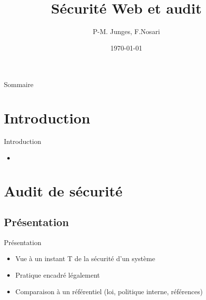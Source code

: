 \documentclass{beamer}
\title{Sécurité Web et audit}
\author{P-M. Junges, F.Nosari}
\institute{Faculté des Sciences et Technologies}
\date{\today}
\begin{document}
\begin{frame}
	\titlepage
\end{frame}

\begin{frame}{Sommaire}
	\tableofcontents
\end{frame}

\section{Introduction}
	\begin{frame}{Introduction}
		\begin{itemize}
			\item %
		\end{itemize}
	\end{frame}

\begin{comment}
	Ca me semble "complet" mais si on doit faire 15 mins de pres
	on risque de prendre pas mal de temps sur cette partie

	I Audit de sécurité
		Definition
			donner def + norme ISO
		Pré requis pour l'audit
			6 principes à respecter
		Preparer l’audit
			expliquer graphique de la page 5 de la norme ISO
		Execution de l’audit
			tests d'intrusion
				def boite blanche, noire, grise
				outils d'intrusion
			test de vulnerabilites
				Outils de tests de vulnerabilites
		Conclure audit
			donner recommendations sur ce qu'il faut changer etc

	En y réfléchissant on aurait moyen de faire notre presentation sur une seule partie
	qui serait donc la partie Audit de sécurité (pour un site web) et ensuite toute la partie
	faille(injection etc.) on en parlerai dans la partie Execution de l'audit.

	Voila, j'attends ton feed back gros !
\end{comment}

\section{Audit de sécurité}
	\subsection{Présentation}
	\begin{frame}{Présentation}
		\begin{itemize}
			\item Vue à un instant T de la sécurité d'un système
			\item Pratique encadré légalement
			\item Comparaison à un référentiel (loi, politique interne, références)
		\end{itemize}
	\end{frame}
\end{document}
